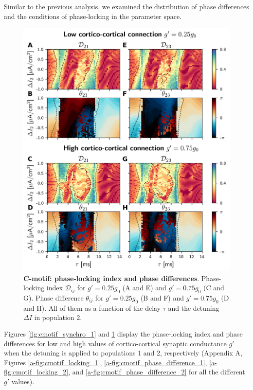 \documentclass[../main.tex]{subfiles}
\begin{document}
Similar to the previous analysis, we examined the distribution of phase differences and the conditions of phase-locking in the parameter space.
\begin{figure}[!htb]
 \centering
    \includegraphics[width=\textwidth]{chapter2/figures/fig7}
    \caption{\textbf{C-motif: phase-locking index and phase differences}.
    Phase-locking index $\mathcal{D}_{ij}$ for $g'=0.25g_0$ (A and E) and $g'=0.75g_0$ (C and G).
    Phase difference $\theta_{ij}$ for $g'=0.25g_0$ (B and F) and $g'=0.75g_0$ (D and H).
    All of them as a function of the delay $\tau$ and the detuning $\Delta I$ in population 2.}
    \label{fig:cmotif_synchro_2}
\end{figure}

Figures \ref{fig:cmotif_synchro_1} and \ref{fig:cmotif_synchro_2} display the phase-locking index and phase differences for low and high values of cortico-cortical synaptic conductance $g'$ when the detuning is applied to populations 1 and 2, respectively (Appendix A, Figures \ref{a-fig:cmotif_locking_1}, \ref{a-fig:cmotif_phase_difference_1}, \ref{a-fig:cmotif_locking_2}, and \ref{a-fig:cmotif_phase_difference_2} for all the different $g'$ values).
\end{document}
